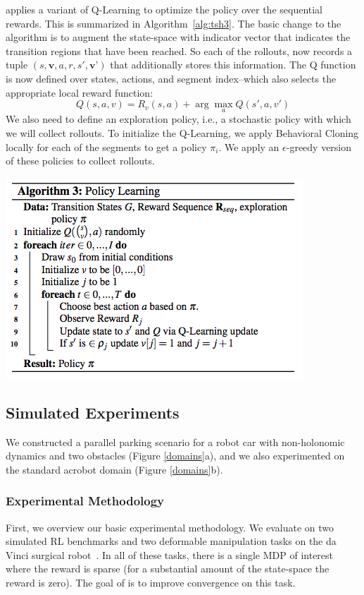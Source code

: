 \hirl applies a variant of Q-Learning to optimize the policy over the sequential rewards. This is summarized in Algorithm~\ref{alg:tsh3}. The basic change to the algorithm is to augment the state-space with indicator vector that indicates the transition regions that have been reached. So each of the rollouts, now records a tuple $(s,\textbf{v},a,r, s', \textbf{v'})$ that additionally stores this information. The Q function is now defined over states, actions, and segment index--which also selects the appropriate local reward function:
\[
Q(s,a,v) = R_v(s,a) + \arg \max_{a} Q(s',a, v')
\]
We also need to define an exploration policy, i.e., a stochastic policy with which we will collect rollouts. To initialize the Q-Learning, we apply Behavioral Cloning locally for each of the segments to get a policy $\pi_i$. We apply an $\epsilon$-greedy version of these policies to collect rollouts.

\includegraphics[width=0.8\linewidth]{swirl-experiments/swirl-alg.png}

\subsection{Simulated Experiments}
We constructed a parallel parking scenario for a robot car with non-holonomic dynamics and two obstacles (Figure \ref{domains}a), and we also experimented on the standard acrobot domain (Figure \ref{domains}b).

\subsubsection{Experimental Methodology}
First, we overview our basic experimental methodology. We evaluate \hirl on two simulated RL benchmarks and two deformable manipulation tasks on the da Vinci surgical robot~\cite{kazanzides2014open}. In all of these tasks, there is a single MDP of interest where the  reward is sparse (for a substantial amount of the state-space the reward is zero). The goal of \hirl is to improve convergence on this task.

